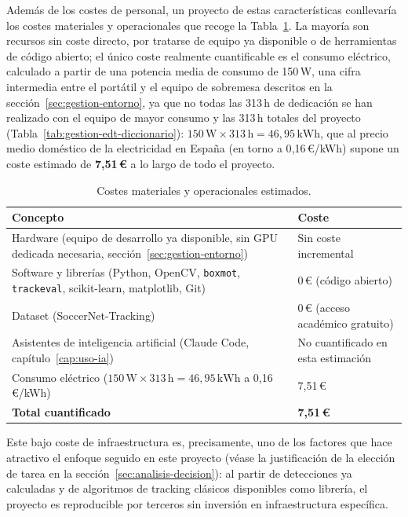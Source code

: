Además de los costes de personal, un proyecto de estas características
conllevaría los costes materiales y operacionales que recoge la
Tabla~\ref{tab:gestion-costes-operacionales}. La mayoría son recursos sin
coste directo, por tratarse de equipo ya disponible o de herramientas de
código abierto; el único coste realmente cuantificable es el consumo
eléctrico, calculado a partir de una potencia media de consumo de
150\,W, una cifra intermedia entre el portátil y el equipo de sobremesa
descritos en la sección~\ref{sec:gestion-entorno}, ya que no todas las
313\,h de dedicación se han realizado con el equipo de mayor consumo y
las 313\,h totales del proyecto (Tabla~\ref{tab:gestion-edt-diccionario}):
$150\,\mathrm{W} \times 313\,\mathrm{h} = 46{,}95\,\mathrm{kWh}$, que al precio
medio doméstico de la electricidad en España (en torno a 0{,}16\,€/kWh)
supone un coste estimado de \textbf{7{,}51\,€} a lo largo de todo el
proyecto.

\begin{table}[htp]
\centering
\caption{Costes materiales y operacionales estimados.}
\label{tab:gestion-costes-operacionales}
\renewcommand{\arraystretch}{1.3}
\begin{tabular}{|p{5.4cm}|p{6.4cm}|}
\hline
\rowcolor{gray!25}
\textbf{Concepto} & \textbf{Coste} \\
\hline
Hardware (equipo de desarrollo ya disponible, sin GPU dedicada necesaria,
  sección~\ref{sec:gestion-entorno}) & Sin coste incremental \\
\hline
Software y librerías (Python, OpenCV, \texttt{boxmot}, \texttt{trackeval},
  scikit-learn, matplotlib, Git) & 0\,€ (código abierto) \\
\hline
Dataset (SoccerNet-Tracking) & 0\,€ (acceso académico gratuito) \\
\hline
Asistentes de inteligencia artificial (Claude Code,
  capítulo~\ref{cap:uso-ia}) & No cuantificado en esta estimación \\
\hline
Consumo eléctrico ($150\,\mathrm{W} \times 313\,\mathrm{h} = 46{,}95\,\mathrm{kWh}$
  a 0{,}16\,€/kWh) & 7{,}51\,€ \\
\hline
\rowcolor{gray!10}
\textbf{Total cuantificado} & \textbf{7{,}51\,€} \\
\hline
\end{tabular}
\end{table}

Este bajo coste de infraestructura es, precisamente, uno de los factores que
hace atractivo el enfoque seguido en este proyecto (véase la justificación de
la elección de tarea en la sección~\ref{sec:analisis-decision}): al partir de
detecciones ya calculadas y de algoritmos de tracking clásicos disponibles
como librería, el proyecto es reproducible por terceros sin inversión en
infraestructura específica.

